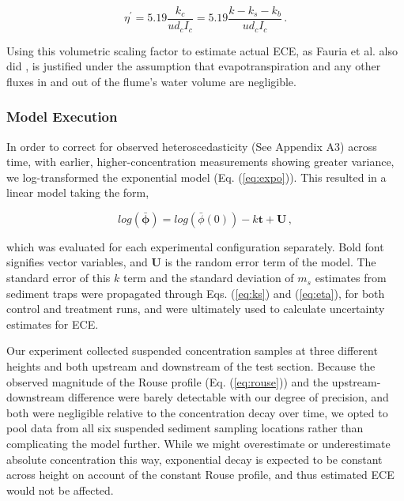 \documentclass[geosciences,article,submit,moreauthors,pdftex]{Definitions/mdpi}
\begin{document}
\begin{equation}
    \eta^\prime = 5.19\frac{k_c}{ud_cI_c} = 5.19\frac{k - k_s - k_b}{ud_cI_c}\,.
    \label{eq:eta}
\end{equation}

\noindent Using this volumetric scaling factor to estimate actual ECE, as Fauria et al. also did \cite{Fauria_2015}, is justified under the assumption that evapotranspiration and any other fluxes in and out of the flume's water volume are negligible.

\subsubsection{Model Execution}

In order to correct for observed heteroscedasticity (See Appendix A3) across time, with earlier, higher-concentration measurements showing greater variance, we log-transformed the exponential model (Eq. (\ref{eq:expo})). This resulted in a linear model taking the form,

\begin{equation}
    log(\boldsymbol{\bar{\phi}}) = log(\bar{\phi}(0)) - k\boldsymbol{t} + \boldsymbol{U} \,,
\end{equation}

\noindent which was evaluated for each experimental configuration separately. Bold font signifies vector variables, and $\boldsymbol{U}$ is the random error term of the model. The standard error of this $k$ term and the standard deviation of $m_s$ estimates from sediment traps were propagated through Eqs. (\ref{eq:ks}) and (\ref{eq:eta}), for both control and treatment runs, and were ultimately used to calculate uncertainty estimates for ECE.

Our experiment collected suspended concentration samples at three different heights and both upstream and downstream of the test section. Because the observed magnitude of the Rouse profile (Eq. (\ref{eq:rouse})) and the upstream-downstream difference were barely detectable with our degree of precision, and both were negligible relative to the concentration decay over time, we opted to pool data from all six suspended sediment sampling locations rather than complicating the model further. While we might overestimate or underestimate absolute concentration this way, exponential decay is expected to be constant across height on account of the constant Rouse profile, and thus estimated ECE would not be affected.
\end{document}
